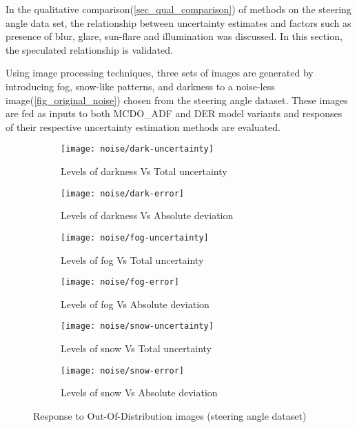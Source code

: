 In the qualitative comparison(\ref{sec_qual_comparison}) of methods on the steering angle data set, the relationship between uncertainty estimates and factors such as presence of blur, glare, sun-flare and illumination was discussed. In this section, the speculated relationship is validated. 

Using image processing techniques, three sets of images are generated by introducing fog, snow-like patterns, and darkness to a noise-less image(\ref{fig_original_noise}) chosen from the steering angle dataset. These images are fed as inputs to both MCDO\_ADF and DER model variants and  responses of their respective uncertainty estimation methods are evaluated. 
\begin{figure}[H]
	\centering
	\begin{subfigure}[b]{0.45\textwidth}
		\centering
		\texttt{[image: noise/dark-uncertainty]}
		\caption{Levels of darkness Vs Total uncertainty}
		\label{mcdo_fn2}
	\end{subfigure}
	\hfill
	\begin{subfigure}[b]{0.45\textwidth}
		\centering
		\texttt{[image: noise/dark-error]}
		\caption{Levels of darkness Vs Absolute deviation}
		\label{der_fn2}
	\end{subfigure}
	\hfill
	\begin{subfigure}[b]{0.45\textwidth}
		\centering
		\texttt{[image: noise/fog-uncertainty]}
		\caption{Levels of fog Vs Total uncertainty}
		\label{homo_fn3}
	\end{subfigure}
	\hfill
	\begin{subfigure}[b]{0.45\textwidth}
		\centering
		\texttt{[image: noise/fog-error]}
		\caption{Levels of fog Vs Absolute deviation}
		\label{hetero_fn3}
	\end{subfigure}
	\hfill
	\begin{subfigure}[b]{0.45\textwidth}
		\centering
		\texttt{[image: noise/snow-uncertainty]}
		\caption{Levels of snow Vs Total uncertainty}
		\label{mcdo_fn3}
	\end{subfigure}
	\hfill
	\begin{subfigure}[b]{0.45\textwidth}
	\centering
	\texttt{[image: noise/snow-error]}
	\caption{Levels of snow Vs Absolute deviation}
	\label{mcdo_fn3}
	\end{subfigure}
	\hfill
	\caption{Response to Out-Of-Distribution images (steering angle dataset)}
	\label{fig_noise_fog}
\end{figure}
